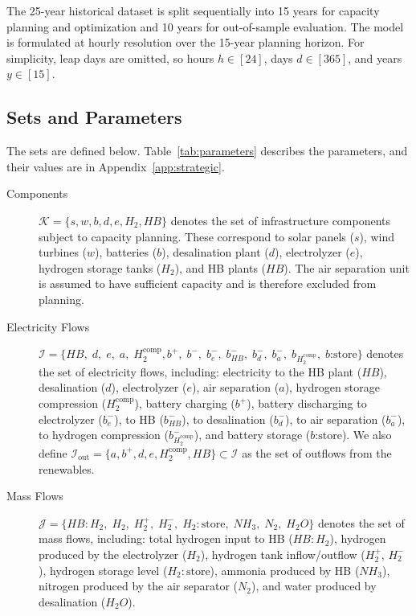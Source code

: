 \documentclass[11pt, letter]{article}
\begin{document}
The 25-year historical dataset is split sequentially into 15 years for capacity planning and optimization and 10 years for out-of-sample evaluation. The model is formulated at hourly resolution over the 15-year planning horizon. For simplicity, leap days are omitted, so hours $h \in [24]$, days $d \in [365]$, and years $y \in [15]$.

\subsection{Sets and Parameters}
The sets are defined below. Table~\ref{tab:parameters} describes the parameters, and their values are in Appendix~\ref{app:strategic}.
\begin{description}
    \item[Components] $\mathcal{K} = \{s, w, b, d, e, H_2, HB\}$ denotes the set of infrastructure components subject to capacity planning. These correspond to solar panels ($s$), wind turbines ($w$), batteries ($b$), desalination plant ($d$), electrolyzer ($e$), hydrogen storage tanks ($H_2$), and HB plants ($HB$). The air separation unit is assumed to have sufficient capacity and is therefore excluded from planning.
    \item[Electricity Flows] $\mathcal{I} = \{ 
HB,\; d,\; e,\; a,\; H_2^{\text{comp}}, b^+,\; b^-,\;b^-_e,\; b^-_{HB},\; b^-_d,\; b^-_a,\; b_{H_2^{\text{comp}}},\; b\text{:store}
\}$ denotes the set of electricity flows, including: electricity to the HB plant ($HB$), desalination ($d$), electrolyzer ($e$), air separation ($a$), hydrogen storage compression ($H_2^{\text{comp}}$), battery charging ($b^+$), battery discharging to electrolyzer ($b^-_e$), to HB ($b^-_{HB}$), to desalination ($b^-_d$), to air separation ($b^-_a$), to hydrogen compression ($b^-_{H_2^\text{comp}}$), and battery storage ($b\text{:store}$). We also define $\mathcal{I}_\mathrm{out} = \{a,b^+,d,e,H_2^{\text{comp}},HB\}\subset \mathcal{I}$ as the set of outflows from the renewables. 

    \item[Mass Flows] $\mathcal{J} = \{
HB{:}H_2,\; H_2,\; H_2^+,\; H_2^-,\; H_2{:}\text{store},\; NH_3,\; N_2,\; H_2O
\}$ denotes the set of mass flows, including: total hydrogen input to HB ($HB{:}H_2$), hydrogen produced by the electrolyzer ($H_2$), hydrogen tank inflow/outflow ($H_2^+$, $H_2^-$), hydrogen storage level ($H_2{:}\text{store}$), ammonia produced by HB ($NH_3$), nitrogen produced by the air separator ($N_2$), and water produced by desalination ($H_2O$).
\end{description}
\end{document}
